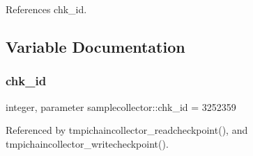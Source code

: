 References chk\+\_\+id.



\subsection{Variable Documentation}
\mbox{\label{namespacesamplecollector_a029f9e194c92603bd4274671b736f565}} 
\subsubsection{\texorpdfstring{chk\+\_\+id}{chk\_id}}
{\footnotesize\ttfamily integer, parameter samplecollector\+::chk\+\_\+id = 3252359\hspace{0.3cm}{\ttfamily [private]}}



Referenced by tmpichaincollector\+\_\+readcheckpoint(), and tmpichaincollector\+\_\+writecheckpoint().

